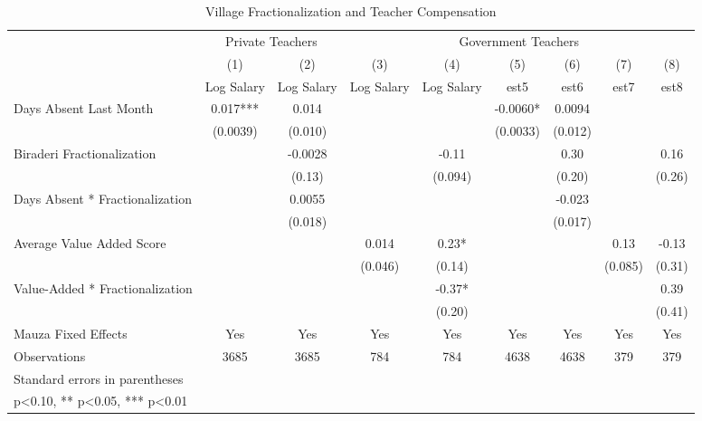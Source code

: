 \begin{table}[htbp]\centering
\def\sym#1{\ifmmode^{#1}\else\(^{#1}\)\fi}
\caption{Village Fractionalization and Teacher Compensation\label{teachercompensation}}
\begin{tabular}{l*{8}{c}}
\toprule
                &\multicolumn{2}{c}{Private Teachers}&\multicolumn{6}{c}{Government Teachers}                                      \\\cmidrule(lr){2-3}\cmidrule(lr){4-9}
                &\multicolumn{1}{c}{(1)}&\multicolumn{1}{c}{(2)}&\multicolumn{1}{c}{(3)}&\multicolumn{1}{c}{(4)}&\multicolumn{1}{c}{(5)}&\multicolumn{1}{c}{(6)}&\multicolumn{1}{c}{(7)}&\multicolumn{1}{c}{(8)}\\
                &\multicolumn{1}{c}{Log Salary}&\multicolumn{1}{c}{Log Salary}&\multicolumn{1}{c}{Log Salary}&\multicolumn{1}{c}{Log Salary}&\multicolumn{1}{c}{est5}&\multicolumn{1}{c}{est6}&\multicolumn{1}{c}{est7}&\multicolumn{1}{c}{est8}\\
\midrule
Days Absent Last Month&    0.017***&    0.014   &            &            &  -0.0060*  &   0.0094   &            &            \\
                & (0.0039)   &  (0.010)   &            &            & (0.0033)   &  (0.012)   &            &            \\
Biraderi Fractionalization&            &  -0.0028   &            &    -0.11   &            &     0.30   &            &     0.16   \\
                &            &   (0.13)   &            &  (0.094)   &            &   (0.20)   &            &   (0.26)   \\
Days Absent * Fractionalization&            &   0.0055   &            &            &            &   -0.023   &            &            \\
                &            &  (0.018)   &            &            &            &  (0.017)   &            &            \\
Average Value Added Score&            &            &    0.014   &     0.23*  &            &            &     0.13   &    -0.13   \\
                &            &            &  (0.046)   &   (0.14)   &            &            &  (0.085)   &   (0.31)   \\
Value-Added * Fractionalization&            &            &            &    -0.37*  &            &            &            &     0.39   \\
                &            &            &            &   (0.20)   &            &            &            &   (0.41)   \\
Mauza Fixed Effects&      Yes   &      Yes   &      Yes   &      Yes   &      Yes   &      Yes   &      Yes   &      Yes   \\
\midrule
Observations    &     3685   &     3685   &      784   &      784   &     4638   &     4638   &      379   &      379   \\
\bottomrule
\multicolumn{9}{l}{\footnotesize Standard errors in parentheses}\\
\multicolumn{9}{l}{\footnotesize * p<0.10, ** p<0.05, *** p<0.01}\\
\end{tabular}
\end{table}
